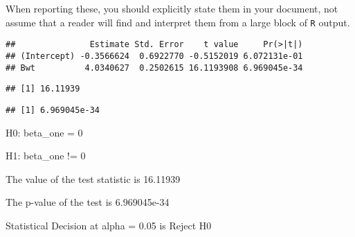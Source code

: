 \documentclass[
]{article}
\newenvironment{Shaded}{\begin{snugshade}}{\end{snugshade}}
\newcommand{\DataTypeTok}[1]{\textcolor[rgb]{0.13,0.29,0.53}{#1}}
\newcommand{\KeywordTok}[1]{\textcolor[rgb]{0.13,0.29,0.53}{\textbf{#1}}}
\newcommand{\NormalTok}[1]{#1}
\newcommand{\OperatorTok}[1]{\textcolor[rgb]{0.81,0.36,0.00}{\textbf{#1}}}
\newcommand{\StringTok}[1]{\textcolor[rgb]{0.31,0.60,0.02}{#1}}
\begin{document}
When reporting these, you should explicitly state them in your document,
not assume that a reader will find and interpret them from a large block
of \texttt{R} output.

\begin{Shaded}
\end{Shaded}

\begin{verbatim}
##               Estimate Std. Error    t value     Pr(>|t|)
## (Intercept) -0.3566624  0.6922770 -0.5152019 6.072131e-01
## Bwt          4.0340627  0.2502615 16.1193908 6.969045e-34
\end{verbatim}

\begin{Shaded}
\end{Shaded}

\begin{verbatim}
## [1] 16.11939
\end{verbatim}

\begin{Shaded}
\end{Shaded}

\begin{verbatim}
## [1] 6.969045e-34
\end{verbatim}

H0: beta\_one = 0

H1: beta\_one != 0

The value of the test statistic is 16.11939

The p-value of the test is 6.969045e-34

Statistical Decision at alpha = 0.05 is Reject H0
\end{document}
